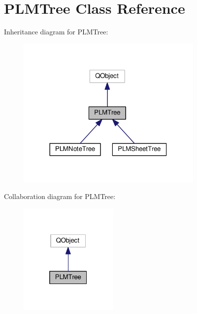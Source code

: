 \hypertarget{class_p_l_m_tree}{}\section{P\+L\+M\+Tree Class Reference}
\label{class_p_l_m_tree}


Inheritance diagram for P\+L\+M\+Tree\+:\nopagebreak
\begin{figure}[H]
\begin{center}
\leavevmode
\includegraphics[width=258pt]{class_p_l_m_tree__inherit__graph}
\end{center}
\end{figure}


Collaboration diagram for P\+L\+M\+Tree\+:\nopagebreak
\begin{figure}[H]
\begin{center}
\leavevmode
\includegraphics[width=136pt]{class_p_l_m_tree__coll__graph}
\end{center}
\end{figure}
